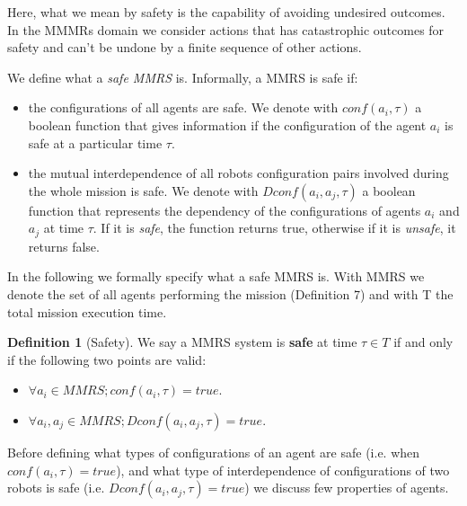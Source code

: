 \documentclass[journal]{IEEEtran}
\theoremstyle{definition}
\newtheorem{definition}{Definition}
\begin{document}
Here, what we mean by safety is the capability of avoiding undesired outcomes. In the MMMRs domain we consider actions that has catastrophic outcomes for safety and can't be undone by a finite sequence of other actions. 

We define what a \textit{safe MMRS} is. Informally, a MMRS is safe if:
\begin{itemize}
\item the configurations of all agents are safe. We denote with $conf(a_i, \tau)$ a boolean function that gives information if the configuration of the agent $a_i$ is safe at a particular time $\tau$.
\item the mutual interdependence of all robots configuration pairs involved during the whole mission is safe. We denote with $Dconf(a_i, a_j,\tau)$ a boolean function that represents the dependency of the configurations of agents $a_i$ and $a_j$ at time $\tau$. If it is \textit{safe}, the function returns true, otherwise if it is \textit{unsafe}, it returns false.
\end{itemize}

In the following we formally specify what a safe MMRS is. With MMRS we denote the set of all agents performing the mission (Definition 7) and with T the total mission execution time. 

\begin{definition}[Safety]
We say a MMRS system is \textbf{safe} at time $\tau \in T$ if and only if the following two points are valid:
\begin{itemize}
\item  $\forall a_i \in MMRS; conf(a_i, \tau)=true$.
 \item  $\forall a_i,a_j \in MMRS; Dconf(a_i, a_j,\tau)=true$.
\end{itemize}
\end{definition}

Before defining what types of configurations of an agent are safe (i.e. when $conf(a_i, \tau)=true$), and what type of interdependence of configurations of two robots is safe (i.e. $Dconf(a_i, a_j,\tau)=true$) we discuss few properties of agents.
\end{document}
